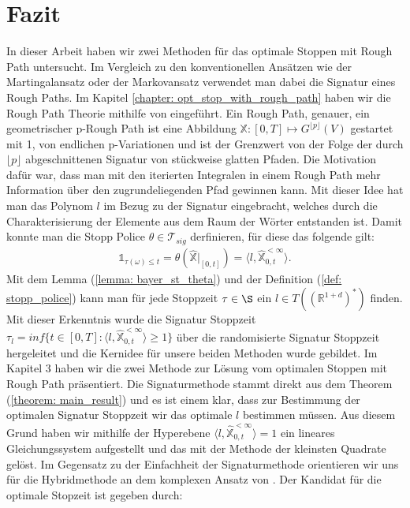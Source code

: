 \documentclass[12pt,titlepage,headsepline]{article}
\begin{document}
    \section{Fazit}
      In dieser Arbeit haben wir zwei Methoden für das optimale Stoppen mit Rough Path untersucht. Im Vergleich zu den konventionellen Ansätzen wie der Martingalansatz oder der Markovansatz verwendet man dabei die Signatur eines Rough Paths.
      \hfill\break
      Im Kapitel \ref{chapter: opt_stop_with_rough_path} haben wir die Rough Path Theorie mithilfe von \cite{bayer_optimal_2020} eingeführt. Ein Rough Path, genauer, ein geometrischer p-Rough Path ist eine Abbildung $\mathbb{X}: [0,T] \mapsto G^{\lfloor p \rfloor}(V)$ gestartet mit 1, von endlichen p-Variationen und ist der Grenzwert von der Folge der durch $\lfloor p \rfloor$ abgeschnittenen Signatur von stückweise glatten Pfaden. Die Motivation dafür war, dass man mit den iterierten Integralen in einem Rough Path mehr Information über den zugrundeliegenden Pfad gewinnen kann. Mit dieser Idee hat man das Polynom $l$ im Bezug zu der Signatur eingebracht, welches durch die Charakterisierung der Elemente aus dem Raum der Wörter entstanden ist. Damit konnte man die Stopp
      Police $\theta \in \mathcal{T}_{sig}$ derfinieren, für diese das folgende gilt:
      \begin{align*}
        \mathds{1}_{\tau(\omega)\leq t}= \theta(\hat{\mathbb{X}}\lvert_{[0,t]}) = \langle l, \hat{\mathbb{X}}_{0,t}^{< \infty} \rangle.
      \end{align*}
      Mit dem Lemma (\ref{lemma: bayer_st_theta}) und der Definition (\ref{def: stopp_police}) kann man für jede Stoppzeit $\tau \in \S$ ein $l \in T((\mathbb{R}^{1+d})^*)$ finden. Mit dieser Erkenntnis wurde die Signatur Stoppzeit
      $\tau_l = inf \{t \in [0,T] : \langle l, \hat{\mathbb{X}}_{0,t}^{< \infty} \rangle \geq 1 \}$ über die randomisierte Signatur Stoppzeit hergeleitet und die Kernidee für unsere beiden Methoden wurde gebildet.
      \hfill\break
      Im Kapitel 3 haben wir die zwei Methode zur Lösung vom optimalen Stoppen mit Rough Path präsentiert. Die Signaturmethode stammt direkt aus dem Theorem (\ref{theorem: main_result}) und es ist einem klar, dass zur Bestimmung der optimalen Signatur Stoppzeit wir das optimale $l$ bestimmen müssen. Aus diesem Grund haben wir mithilfe der Hyperebene $\langle l, \hat{\mathbb{X}}_{0,t}^{< \infty} \rangle = 1$ ein lineares Gleichungssystem aufgestellt und das mit der Methode der kleinsten Quadrate gelöst.
      \hfill\break
      Im Gegensatz zu der Einfachheit der Signaturmethode orientieren wir uns für die Hybridmethode an dem komplexen Ansatz von \cite{becker_deep_2019}. Der Kandidat für die optimale Stopzeit ist gegeben durch:
\end{document}
